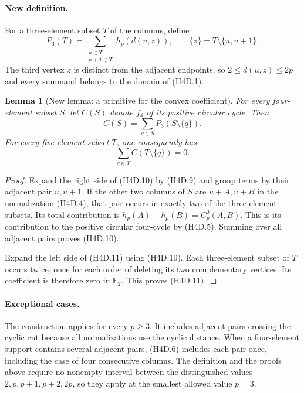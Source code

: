 \documentclass[11pt,oneside]{report}
\newtheorem{lemma}[theorem]{Lemma}
\theoremstyle{definition}
\numberwithin{equation}{section}
\begin{document}
\paragraph{New definition.}
For a three-element subset $T$ of the columns, define
\[
 P_3(T)=\sum_{\substack{u\in T\\u+1\in T}}
          h_p(d(u,z)),\qquad
          \{z\}=T\setminus\{u,u+1\}.
 \tag{H4D.9}
\]
The third vertex $z$ is distinct from the adjacent endpoints, so
$2\leq d(u,z)\leq2p$ and every summand belongs to the domain of
(H4D.1).

\begin{lemma}[New lemma: a primitive for the convex coefficient]
\label{J21:lem:h4-convex-primitive}
For every four-element subset $S$, let $C(S)$ denote $f_4$ of its
positive circular cycle. Then
\[
                     C(S)=\sum_{q\in S}P_3(S\setminus\{q\}).
 \tag{H4D.10}
\]
For every five-element subset $T$, one consequently has
\[
                        \sum_{q\in T}C(T\setminus\{q\})=0.
 \tag{H4D.11}
\]
\end{lemma}
\begin{proof}
Expand the right side of (H4D.10) by (H4D.9) and group terms by
their adjacent pair $u,u+1$. If the other two columns of $S$ are
$u+A,u+B$ in the normalization (H4D.4), that pair occurs in exactly
two of the three-element subsets. Its total contribution is
$h_p(A)+h_p(B)=C_p^0(A,B)$.
This is its contribution to the positive circular four-cycle by
(H4D.5). Summing over all adjacent pairs proves (H4D.10).

Expand the left side of (H4D.11) using (H4D.10). Each three-element
subset of $T$ occurs twice, once for each order of deleting its two
complementary vertices. Its coefficient is therefore zero in
$\mathbb F _2$. This proves (H4D.11).
\end{proof}

\paragraph{Exceptional cases.}
The construction applies for every $p\geq3$. It includes adjacent
pairs crossing the cyclic cut because all normalizations use the
cyclic distance. When a four-element support contains several
adjacent pairs, (H4D.6) includes each pair once, including the case
of four consecutive columns. The definition and the proofs above
require no nonempty interval between the distinguished values
$2,p,p+1,p+2,2p$, so they apply at the smallest allowed value $p=3$.
\end{document}
